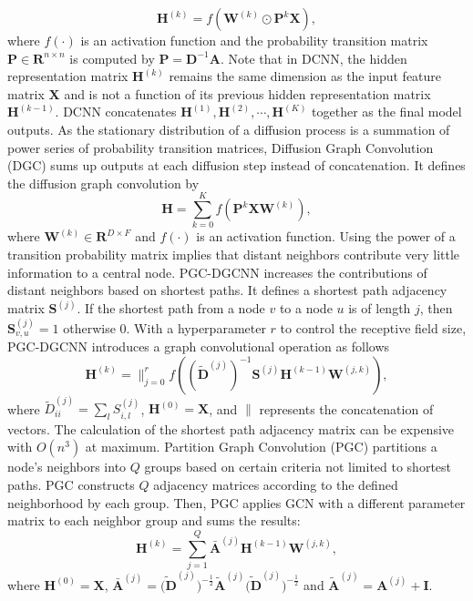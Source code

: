     \begin{equation}
	\label{eq:dcnn}
	\mathbf{H}^{(k)} = f(\mathbf{W}^{(k)}\odot \mathbf{P}^{k} \mathbf{X}),
	\end{equation}
    where $f(\cdot)$ is an activation function and the probability transition matrix $\mathbf{P}\in\mathbf{R}^{n\times n}$ is computed by $\mathbf{P}= \mathbf{D}^{-1}\mathbf{A}$.  Note that in DCNN, the hidden representation matrix $\mathbf{H}^{(k)}$ remains the same dimension as the input feature matrix $\mathbf{X}$ and is not a function of its previous hidden representation matrix $\mathbf{H}^{(k-1)}$. DCNN concatenates $\mathbf{H}^{(1)},\mathbf{H}^{(2)},\cdots,\mathbf{H}^{( K)} $ together as the final model outputs. As the stationary distribution of a diffusion process is a summation of power series of probability transition matrices, Diffusion Graph Convolution (DGC) \cite{li2018diffusion} sums up outputs at each diffusion step instead of concatenation. It defines the diffusion graph convolution by
    \begin{equation}
    \label{eq:dcn}
    \mathbf{H} = \sum_{k=0}^{K} f(\mathbf{P}^k\mathbf{X}\mathbf{W}^{(k)}),
\end{equation}
    where $\mathbf{W}^{(k)}\in \mathbf{R}^{D\times F}$ and $f(\cdot)$ is an activation function. 
    Using the power of a transition probability matrix implies that distant neighbors contribute very little information to a central node. PGC-DGCNN \cite{tran2018filter} increases the contributions of distant neighbors based on shortest paths.  It defines a shortest path adjacency matrix $\mathbf{S}^{(j)}$. If the shortest path from a node $v$ to a node $u$ is of length $j$, then $\mathbf{S}^{(j)}_{v,u}=1$ otherwise 0. With a hyperparameter $r$ to control the receptive field size, PGC-DGCNN introduces a graph convolutional operation as follows 
    \begin{equation}
        \mathbf{H}^{(k)} = \parallel_{j=0}^r f((\tilde{\mathbf{D}}^{(j)})^{-1}\mathbf{S}^{(j)}\mathbf{H}^{(k-1)}\mathbf{W}^{(j,k)}),
    \end{equation}
    where $\tilde{D}^{(j)}_{ii}=\sum_l S_{i,l}^{(j)}$, $\mathbf{H}^{(0)}=\mathbf{X}$, and $\parallel$ represents the concatenation of vectors. The calculation of the shortest path adjacency matrix can be expensive with $O(n^3)$ at maximum.  Partition Graph Convolution (PGC) \cite{yan2018spatial} partitions a node's neighbors into $Q$ groups based on certain criteria not limited to shortest paths.  PGC constructs $Q$ adjacency matrices according to the defined neighborhood by each group. Then, PGC applies GCN \cite{kipf2017semi} with a different parameter matrix to each neighbor group and sums the results:
	\begin{equation}
	\label{eq:pgcn}
	\mathbf{H}^{(k)} = \sum_{j=1}^{Q} \mathbf{\bar{A}}^{(j)}\mathbf{H}^{(k-1)}\mathbf{W}^{(j,k)},
	\end{equation}
	where $\mathbf{H}^{(0)}=\mathbf{X}$, $\mathbf{\bar{A}}^{(j)}=\tilde{(\mathbf{D}}^{(j)})^{-\frac{1}{2}}\tilde{\mathbf{A}}^{(j)}\tilde{(\mathbf{D}}^{(j)})^{-\frac{1}{2}}$ and $\tilde{\mathbf{A}}^{(j)}=\mathbf{A}^{(j)}+\mathbf{I}$.
	
